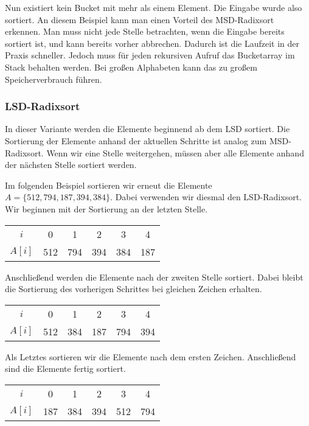 Nun existiert kein Bucket mit mehr als einem Element. Die Eingabe wurde also sortiert.
An diesem Beispiel kann man einen Vorteil des MSD-Radixsort erkennen.
Man muss nicht jede Stelle betrachten, wenn die Eingabe bereits sortiert ist, und kann bereits vorher abbrechen.
Dadurch ist die Laufzeit in der Praxis schneller.
Jedoch muss für jeden rekursiven Aufruf das Bucketarray im Stack behalten werden.
Bei großen Alphabeten kann das zu großem Speicherverbrauch führen.

\subsubsection{LSD-Radixsort}
\label{sort:radix:lsd}

In dieser Variante werden die Elemente beginnend ab dem LSD sortiert.
Die Sortierung der Elemente anhand der aktuellen Schritte ist analog zum MSD-Radixsort.
Wenn wir eine Stelle weitergehen, müssen aber alle Elemente anhand der nächsten Stelle sortiert werden.

Im folgenden Beispiel sortieren wir erneut die Elemente $A=\{512, 794, 187, 394, 384\}$.
Dabei verwenden wir diesmal den LSD-Radixsort.
Wir beginnen mit der Sortierung an der letzten Stelle.

\begin{table}[H]
	\centering
	\begin{tabular}{c|| c | c c c | c }
		$i$ & 0 & 1 & 2 & 3 & 4 \\
		$A[i]$ & 512 & 794 & 394 & 384 & 187
	\end{tabular}
	\label{tab:radix:lsd:step_1}
\end{table}

Anschließend werden die Elemente nach der zweiten Stelle sortiert.
Dabei bleibt die Sortierung des vorherigen Schrittes bei gleichen Zeichen erhalten.

\begin{table}[H]
	\centering
	\begin{tabular}{c|| c | c c | c c }
		$i$ & 0 & 1 & 2 & 3 & 4 \\
		$A[i]$ & 512 & 384 & 187 & 794 & 394
	\end{tabular}
	\label{tab:radix:lsd:step_2}
\end{table}

Als Letztes sortieren wir die Elemente nach dem ersten Zeichen.
Anschließend sind die Elemente fertig sortiert.

\begin{table}[H]
	\centering
	\begin{tabular}{c|| c | c c | c | c }
		$i$ & 0 & 1 & 2 & 3 & 4 \\
		$A[i]$ & 187 & 384 & 394 & 512 & 794
	\end{tabular}
	\label{tab:radix:lsd:step_3}
\end{table}

